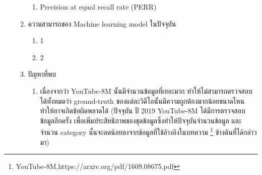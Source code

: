 \begin{enumerate}
\begin{enumerate}
\begin{enumerate}
			\item Precision at equal recall rate (PERR)
		\end{enumerate}
		\item ความสามารถของ Machine learning model ในปัจจุบัน
		\begin{enumerate}
			\setlength\itemsep{-0.25em}
			\item 1 %
			\item 2 %
		\end{enumerate}
		\item ปัญหาที่พบ
		\begin{enumerate}
		\item เนื่องจากว่า YouTube-8M นั้นมีจำนวนข้อมูลที่เยอะมาก ทำให้ไม่สามารถตรวจสอบได้ทั้งหมดว่า ground-truth ของแต่ละวิดีโอนั้นมีความถูกต้องมากน้อยขนาดไหน ทำให้อาจเกิดข้อผิดพลาดได้ (ปัจจุบัน ปี 2019 YouTube-8M ได้มีการตรวจสอบข้อมูลอีกครั้ง เพื่อเพิ่มประสิทธิภาพของชุดข้อมูลซึ่งทำให้ปัจจุบันจำนวนข้อมูล และจำนวน category นั้นจะลดน้อยลงจากข้อมูลที่ใช้อ้างอิงในบทความ \footnote{YouTube-8M,https://arxiv.org/pdf/1609.08675.pdf} ข้างต้นที่ได้กล่าวมา)
	\end{enumerate}	

	\end{enumerate}	
	\end{enumerate}	

